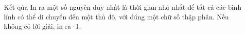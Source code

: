 Kết qủa
In ra một số nguyên duy nhất là thời gian nhỏ nhất để tất cả các binh lính có thể di chuyển đến một thủ đô, với đúng một chữ số thập phân. Nếu không có lời giải, in ra -1.